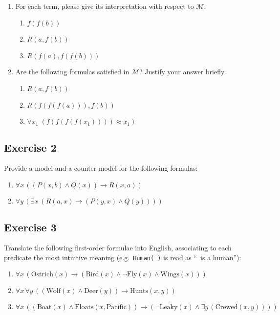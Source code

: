 \documentclass[11pt]{article}
\begin{document}
    \begin{enumerate}
        \item For each term, please give its interpretation with respect to $\mathcal{M}$:
        \begin{enumerate}
            \item $f(f(b))$
            \item $R(a, f(b))$
            \item $R(f(a), f(f(b)))$
        \end{enumerate}
        \item Are the following formulas satisfied in $\mathcal{M}$? Justify your answer briefly.
        \begin{enumerate}
            \item $R(a, f(b))$
            \item $R(f(f(f(a))), f(b))$
            \item $\forall x_1 \; (f(f(f(f(x_1)))) \approx x_1)$
        \end{enumerate}
    \end{enumerate}

    \subsection{Exercise 2}\label{subsec:exercise-2}

    Provide a model and a counter-model for the following formulas:

    \begin{enumerate}
        \item $\forall x\, ((P(x, b) \wedge Q(x)) \rightarrow R(x, a))$

        \item $\forall y\, (\exists x\ (R(a, x) \rightarrow (P(y, x) \wedge Q(y))))$
    \end{enumerate}


    \subsection{Exercise 3}\label{subsec:exercise-3}

    Translate the following first-order formulae into English, associating to each predicate the most intuitive meaning (e.g.\ \texttt{Human( )} is read as ``\, is a human''):

    \begin{enumerate}
        \item $\forall x\, (\text{Ostrich}(x) \rightarrow (\text{Bird}(x) \wedge \neg \text{Fly}(x) \wedge \text{Wings}(x)))$

        \item $\forall x\, \forall y\, ((\text{Wolf}(x) \wedge \text{Deer}(y)) \rightarrow \text{Hunts}(x, y))$

        \item $\forall x\, ((\text{Boat}(x) \wedge \text{Floats}(x, \text{Pacific})) \rightarrow (\neg\text{Leaky}(x) \wedge \exists y\, (\text{Crewed}(x, y))))$
    \end{enumerate}
\end{document}
